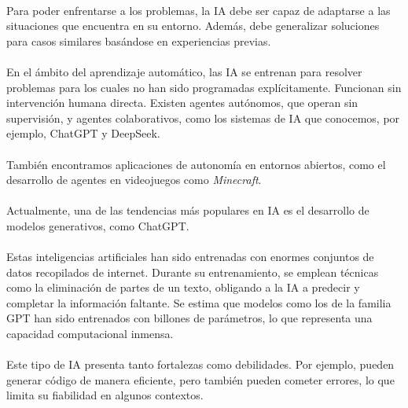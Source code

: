 \documentclass[a4paper,12pt]{article}
\begin{document}
\paragraph{}
Para poder enfrentarse a los problemas, la IA debe ser capaz de adaptarse a las situaciones que encuentra en su entorno. Además, debe generalizar soluciones para casos similares basándose en experiencias previas.

\paragraph{}
En el ámbito del aprendizaje automático, las IA se entrenan para resolver problemas para los cuales no han sido programadas explícitamente. Funcionan sin intervención humana directa. Existen agentes autónomos, que operan sin supervisión, y agentes colaborativos, como los sistemas de IA que conocemos, por ejemplo, ChatGPT y DeepSeek.

\paragraph{}
También encontramos aplicaciones de autonomía en entornos abiertos, como el desarrollo de agentes en videojuegos como \textit{Minecraft}.

\paragraph{}
Actualmente, una de las tendencias más populares en IA es el desarrollo de modelos generativos, como ChatGPT. 

\paragraph{}
Estas inteligencias artificiales han sido entrenadas con enormes conjuntos de datos recopilados de internet. Durante su entrenamiento, se emplean técnicas como la eliminación de partes de un texto, obligando a la IA a predecir y completar la información faltante. Se estima que modelos como los de la familia GPT han sido entrenados con billones de parámetros, lo que representa una capacidad computacional inmensa.

\paragraph{}
Este tipo de IA presenta tanto fortalezas como debilidades. Por ejemplo, pueden generar código de manera eficiente, pero también pueden cometer errores, lo que limita su fiabilidad en algunos contextos.
\end{document}
